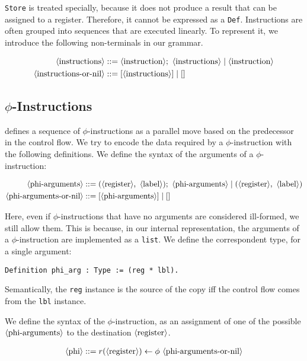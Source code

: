 \texttt{Store} is treated specially, because it does not produce a result that can be assigned to a register. Therefore, it cannot be expressed as a \texttt{Def}.
Instructions are often grouped into sequences that are executed linearly. To represent it, we introduce the following non-terminals in our grammar.

\begin{align*}
\langle\text{instructions}\rangle &::= \langle\text{instruction}\rangle ; \ \langle\text{instructions}\rangle \mid \langle\text{instruction}\rangle \\
\langle\text{instructions-or-nil}\rangle &::= [ \langle\text{instructions}\rangle ] \mid []
\end{align*}

\subsection{$\phi$-Instructions}

 defines a sequence of $\phi$-instructions as a parallel move based on the predecessor in the control flow.
We try to encode the data required by a $\phi$-instruction with the following definitions. We define the syntax of the arguments of a $\phi$-instruction:

\begin{align*}
\nt{phi-arguments} &::= ( \nt{register} , \ \nt{label} ) ; \ \nt{phi-arguments} \mid (\nt{register} , \ \nt{label}) \\
\nt{phi-arguments-or-nil} &::= [ \nt{phi-arguments} ] \mid []
\end{align*}

Here, even if $\phi$-instructions that have no arguments are considered ill-formed, we still allow them. This is because, in our internal representation, the arguments of a $\phi$-instruction are implemented as a \texttt{list}.
We define the correspondent type, for a single argument:

\begin{lstlisting}[style=Rocq]
Definition phi_arg : Type := (reg * lbl).
\end{lstlisting}

Semantically, the \texttt{reg} instance is the source of the copy iff the control flow comes from the \texttt{lbl} instance.

We define the syntax of the $\phi$-instruction, as an assignment of one of the possible $\langle\text{phi-arguments}\rangle$ to the destination $\langle\text{register}\rangle$.

\begin{align*}
\nt{phi} ::= r( \nt{register} ) \leftarrow \phi \ \nt{phi-arguments-or-nil}
\end{align*}

